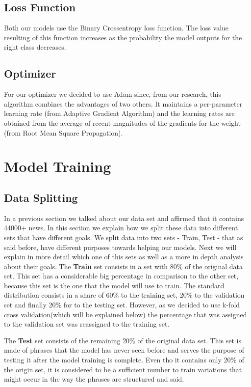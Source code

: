 \documentclass[conference]{IEEEtran}
\newcommand\tab[1][0.4cm]{\hspace*{#1}}
\begin{document}
\subsection{Loss Function \cite{Q}} Both our models use the Binary Crossentropy loss function. The loss value resulting of this function increases as the probability the model outputs for the right class decreases.

\subsection{Optimizer \cite{R}} For our optimizer we decided to use Adam since, from our research, this algorithm combines the advantages of two others. It maintains a per-parameter learning rate (from Adaptive Gradient Algorithm) and the learning rates are obtained from the average of recent magnitudes of the gradients for the weight (from Root Mean Square Propagation).

\section{Model Training}
\subsection{Data Splitting}

In a previous section we talked about our data set and affirmed that it contains 44000+ news. In this section we explain how we split these data into different sets that have different goals. We split data into two sets - Train, Test - that as said before, have different purposes towards helping our models. Next we will explain in more detail which one of this sets as well as a more in depth analysis about their goals.
\linebreak
\tab The \textbf{Train} set consists in a set with 80\% of the original data set. This set has a considerable big percentage in comparison to the other set, because this set is the one that the model will use to train. The standard distribution consists in a share of 60\% to the training set, 20\% to the validation set and finally 20\% for to the testing set. However, as we decided to use k-fold cross validation(which will be explained below) the percentage that was assigned to the validation set was reassigned to the training set.

The \textbf{Test} set consists of the remaining 20\% of the original data set. This set is made of phrases that the model has never seen before and serves the purpose of testing it after the model training is complete. Even tho it contains only 20\% of the origin set, it is considered to be a sufficient number to train variations that might occur in the way the phrases are structured and said.
\end{document}
